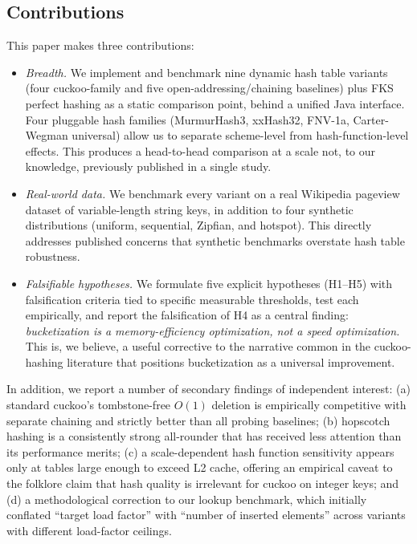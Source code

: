 \documentclass[10pt,journal,compsoc]{IEEEtran}
\begin{document}
\subsection{Contributions}
This paper makes three contributions:
\begin{itemize}
    \item \emph{Breadth.} We implement and benchmark nine dynamic hash table variants (four cuckoo-family and five open-addressing/chaining baselines) plus FKS perfect hashing as a static comparison point, behind a unified Java interface. Four pluggable hash families (MurmurHash3, xxHash32, FNV-1a, Carter-Wegman universal) allow us to separate scheme-level from hash-function-level effects. This produces a head-to-head comparison at a scale not, to our knowledge, previously published in a single study.
    \item \emph{Real-world data.} We benchmark every variant on a real Wikipedia pageview dataset of variable-length string keys, in addition to four synthetic distributions (uniform, sequential, Zipfian, and hotspot). This directly addresses published concerns that synthetic benchmarks overstate hash table robustness.
    \item \emph{Falsifiable hypotheses.} We formulate five explicit hypotheses (H1--H5) with falsification criteria tied to specific measurable thresholds, test each empirically, and report the falsification of H4 as a central finding: \emph{bucketization is a memory-efficiency optimization, not a speed optimization.} This is, we believe, a useful corrective to the narrative common in the cuckoo-hashing literature that positions bucketization as a universal improvement.
\end{itemize}

In addition, we report a number of secondary findings of independent interest: (a) standard cuckoo's tombstone-free $O(1)$ deletion is empirically competitive with separate chaining and strictly better than all probing baselines; (b) hopscotch hashing is a consistently strong all-rounder that has received less attention than its performance merits; (c) a scale-dependent hash function sensitivity appears only at tables large enough to exceed L2 cache, offering an empirical caveat to the folklore claim that hash quality is irrelevant for cuckoo on integer keys; and (d) a methodological correction to our lookup benchmark, which initially conflated ``target load factor'' with ``number of inserted elements'' across variants with different load-factor ceilings.
\end{document}
